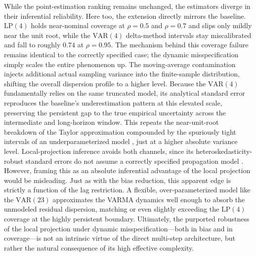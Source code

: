While the point-estimation ranking remains unchanged, the estimators diverge in their inferential reliability. Here too, the extension directly mirrors the baseline. $\text{LP}(4)$ holds near-nominal coverage at $\rho=0.5$ and $\rho=0.7$ and slips only mildly near the unit root, while the $\text{VAR}(4)$ delta-method intervals stay miscalibrated and fall to roughly $0.74$ at $\rho=0.95$. The mechanism behind this coverage failure remains identical to the correctly specified case; the dynamic misspecification simply scales the entire phenomenon up. The moving-average contamination injects additional actual sampling variance into the finite-sample distribution, shifting the overall dispersion profile to a higher level. Because the $\text{VAR}(4)$ fundamentally relies on the same truncated model, its analytical standard error reproduces the baseline's underestimation pattern at this elevated scale, preserving the persistent gap to the true empirical uncertainty across the intermediate and long-horizon window. This repeats the near-unit-root breakdown of the Taylor approximation \parencite{kilian1998small,kilian1999finite} compounded by the spuriously tight intervals of an underparameterized model \parencite{kilian2001impulse}, just at a higher absolute variance level. Local-projection inference avoids both channels, since its heteroskedasticity-robust standard errors do not assume a correctly specified propagation model \parencite{montiel2021local}. However, framing this as an absolute inferential advantage of the local projection would be misleading. Just as with the bias reduction, this apparent edge is strictly a function of the lag restriction. A flexible, over-parameterized model like the $\text{VAR}(23)$ approximates the VARMA dynamics well enough to absorb the unmodeled residual dispersion, matching or even slightly exceeding the $\text{LP}(4)$ coverage at the highly persistent boundary. Ultimately, the purported robustness of the local projection under dynamic misspecification---both in bias and in coverage---is not an intrinsic virtue of the direct multi-step architecture, but rather the natural consequence of its high effective complexity.

\FloatBarrier